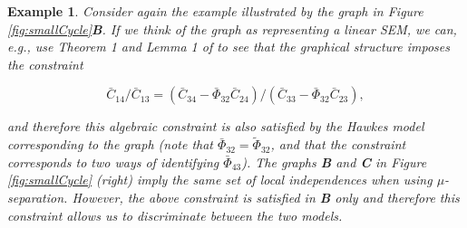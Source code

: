 \documentclass[accepted]{uai2021} %
\newtheorem{exmp}[thm]{Example}
\begin{document}
\begin{exmp}
	\label{exmp:eqSmallCycle}
	Consider again the example illustrated by the graph in Figure 
	\ref{fig:smallCycle}\textbf{B}. If we think of the graph as representing a 
	linear SEM, we can, e.g., use Theorem 1 and Lemma 1 of \cite{chen2014} to 
	see that the graphical structure imposes the constraint 
	
	$$\bar{C}_{14}/\bar{C}_{13} = (\bar{C}_{34} - 
	\bar{\Phi}_{32}\bar{C}_{24})/(\bar{C}_{33} - 
	\bar{\Phi}_{32}\bar{C}_{23}),$$ 
	
	and 
	therefore this algebraic constraint is also satisfied by the Hawkes model 
	corresponding to the graph (note that $\bar{\Phi}_{32} = 
	\tilde{\Phi}_{32}$, and that the constraint corresponds to
	two ways of identifying $\bar{\Phi}_{43}$). The graphs \textbf{B} and 
	\textbf{C} in Figure 
	\ref{fig:smallCycle} (right) 
	imply the same set of local independences
	when using $\mu$-separation. However, the above constraint is satisfied in 
	\textbf{B} only and therefore this constraint allows us to 
	discriminate between the two models.
\end{exmp}
\end{document}
